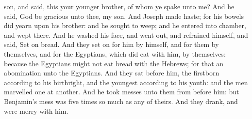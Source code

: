 {son, and
said,
{} this your
younger
brother, of whom ye
spake unto me? And he
said,
God be
gracious unto thee, my
son.
And
Joseph made
haste; for his
bowels did
yearn upon his
brother: and he
sought
{} to
weep; and he
entered into
{}
chamber, and
wept there.
And he
washed his
face, and went
out, and
refrained himself, and
said, Set
on
bread.
And they set
on for him by himself, and for them by themselves, and for the
Egyptians, which did
eat with him, by themselves: because the
Egyptians
might not
eat
bread with the
Hebrews; for that
{} an
abomination unto the
Egyptians.
And they
sat before
him, the
firstborn according to his
birthright, and the
youngest according to his
youth: and the
men
marvelled
one at
another.
And he
took
{}
messes unto them from before
him: but
Benjamin’s
mess was
five
times so much
as any of theirs. And they
drank, and were
merry with him.

}
